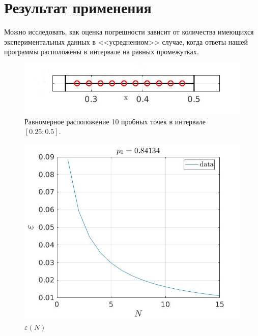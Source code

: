 \documentclass[a4paper,12pt]{article} %
\begin{document}
\section{Результат применения}

Можно исследовать, как оценка погрешности зависит от количества имеющихся экспериментальных данных в <<усредненном>> случае, когда ответы нашей программы расположены в интервале на равных промежутках.

\begin{figure}[h!]
\begin{center}
\includegraphics[width=1\textwidth]{./pics/uni_line}
\end{center}
\caption{Равномерное расположение 10 пробных точек в интервале $[0.25; 0.5]$.} \label{img:uni_line}
\end{figure}

\begin{figure}[h!]
\begin{center}
\includegraphics[width=1\textwidth]{./pics/linear}
\end{center}
\caption{$\varepsilon(N)$} \label{img:linear}
\end{figure}
\end{document}
